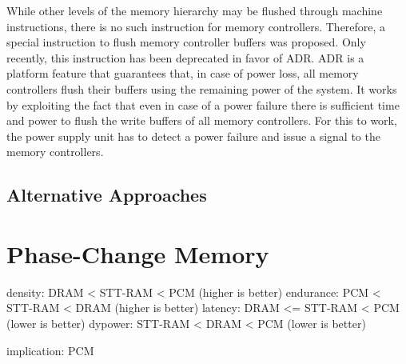 
While other levels of the memory hierarchy may be flushed through machine
instructions, there is no such instruction for memory controllers. Therefore,
 a special instruction to flush memory controller buffers was
proposed. Only recently, this instruction has been deprecated in favor of
\ac{ADR}. \ac{ADR} is a platform feature that guarantees that, in case of power
loss, all memory controllers flush their buffers using the remaining power of
the system. It works by exploiting the fact that even in case of a power failure
there is sufficient time and power to flush the write buffers of all memory
controllers. For this to work, the power supply unit has to detect a power
failure and issue a signal to the memory controllers.

\subsection{Alternative Approaches}


\section{Phase-Change Memory}


density: DRAM < STT-RAM < PCM (higher is better)
endurance: PCM < STT-RAM < DRAM (higher is better)
latency: DRAM <= STT-RAM < PCM (lower is better)
dypower: STT-RAM < DRAM < PCM (lower is better)

implication: PCM
